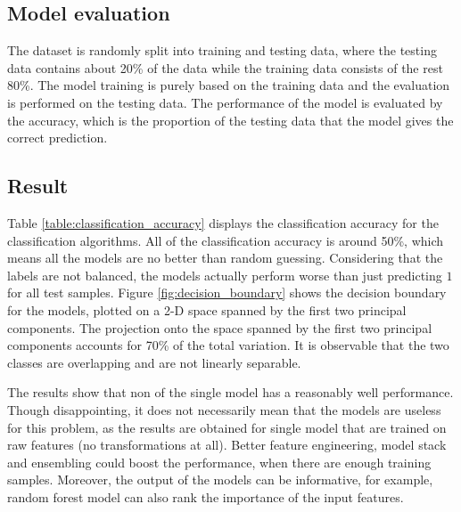 \documentclass[12pt]{article}
\begin{document}
\subsection{Model evaluation}
The dataset is randomly split into training and testing data, where the testing data contains about 20\% of the data while the training data consists of the rest 80\%. The model training is purely based on the training data and the evaluation is performed on the testing data. The performance of the model is evaluated by the accuracy, which is the proportion of the testing data that the model gives the correct prediction. 

\subsection{Result}
Table \ref{table:classification_accuracy} displays the classification accuracy for the classification algorithms.  All of the classification accuracy is around 50\%, which means all the models are no better than random guessing. Considering that the labels are not balanced, the models actually perform worse than just predicting $1$ for all test samples. Figure \ref{fig:decision_boundary} shows the decision boundary for the models,  plotted on a 2-D space spanned by the first two principal components. The projection onto the space spanned by the first two principal components accounts for  70\% of the total variation. It is observable that the two classes are overlapping and are not linearly separable. 

The results show that non of the single model has a reasonably well performance.  Though disappointing, it does not necessarily mean that the models are useless for this problem, as the results are obtained for single model that are trained on raw features (no transformations at all). Better feature engineering, model stack and ensembling could boost the performance, when there are enough training samples. Moreover, the output of the models can be informative, for example, random forest model can also rank the importance of the input features.
\end{document}
